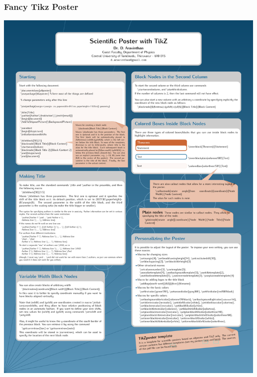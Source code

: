 \documentclass[[newPxFont]{beamer}
\begin{document}
\begin{frame}[fragile=singleslide]
  \frametitle{Fancy Tikz Poster}
\begin{center}
\includegraphics[scale=0.06]{figs/fancytikzposter}
\end{center}
\end{frame}
\fi
\end{document}
